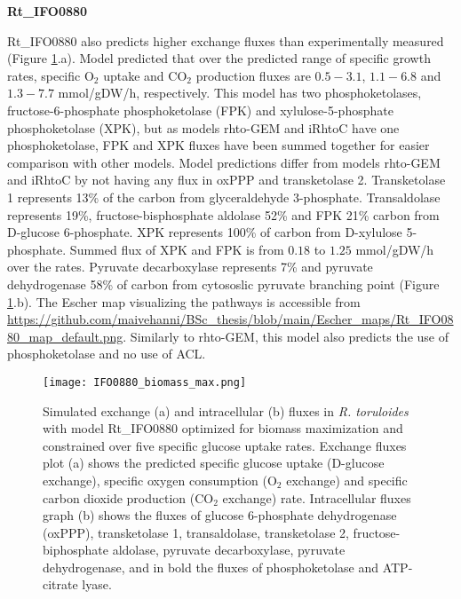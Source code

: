 \textbf{Rt\_IFO0880}

Rt\_IFO0880 also predicts higher exchange fluxes than experimentally measured (Figure \ref{fig:IFO0880_biomass_max}.a). Model predicted that over the predicted range of specific growth rates, specific O$_2$ uptake and CO$_2$ production fluxes are $0.5-3.1$, $1.1-6.8$ and $1.3-7.7$ \unit{mmol/gDW/h}, respectively. 
This model has two phosphoketolases, fructose-6-phosphate phosphoketolase (FPK) and xylulose-5-phosphate phosphoketolase (XPK), but as models rhto-GEM and iRhtoC have one phosphoketolase, FPK and XPK fluxes have been summed together for easier comparison with other models. Model predictions differ from models rhto-GEM and iRhtoC by not having any flux in oxPPP and transketolase 2. Transketolase 1 represents 13\% of the carbon from glyceraldehyde 3-phosphate. Transaldolase represents 19\%, fructose-bisphosphate aldolase 52\% and FPK 21\% carbon from D-glucose 6-phosphate. XPK represents 100\% of carbon from D-xylulose 5-phosphate. Summed flux of XPK and FPK is from $0.18$ to $1.25$ \unit{mmol/gDW/h} over the rates.
Pyruvate decarboxylase represents 7\% and pyruvate dehydrogenase 58\% of carbon from cytososlic pyruvate branching point (Figure \ref{fig:IFO0880_biomass_max}.b). The Escher map visualizing the pathways is accessible from \url{https://github.com/maivehanni/BSc_thesis/blob/main/Escher_maps/Rt_IFO0880_map_default.png}. Similarly to rhto-GEM, this model also predicts the use of phosphoketolase and no use of ACL. 
\begin{figure}[H]
    \centering
    \texttt{[image: IFO0880\_biomass\_max.png]}
    \caption{Simulated exchange (a) and intracellular (b) fluxes in \textit{R. toruloides} with model Rt\_IFO0880 optimized for biomass maximization and constrained over five specific glucose uptake rates. Exchange fluxes plot (a) shows the predicted specific glucose uptake (D-glucose exchange), specific oxygen consumption (O$_2$ exchange) and specific carbon dioxide production (CO$_2$ exchange) rate. Intracellular fluxes graph (b) shows the fluxes of glucose 6-phosphate dehydrogenase (oxPPP), transketolase 1, transaldolase, transketolase 2, fructose-biphosphate aldolase, pyruvate decarboxylase, pyruvate dehydrogenase, and in bold the fluxes of phosphoketolase and ATP-citrate lyase.}
    \label{fig:IFO0880_biomass_max}
\end{figure}

